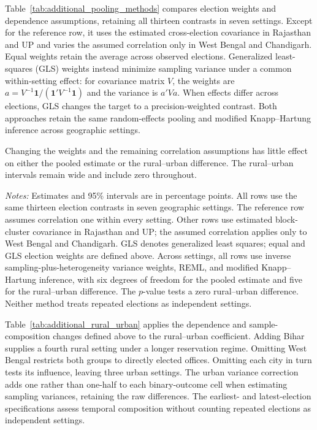 Table~\ref{tab:additional_pooling_methods} compares election weights and dependence assumptions, retaining all thirteen contrasts in seven settings. Except for the reference row, it uses the estimated cross-election covariance in Rajasthan and UP and varies the assumed correlation only in West Bengal and Chandigarh. Equal weights retain the average across observed elections. Generalized least-squares (GLS) weights instead minimize sampling variance under a common within-setting effect: for covariance matrix $V$, the weights are $a=V^{-1}\mathbf{1}/(\mathbf{1}'V^{-1}\mathbf{1})$ and the variance is $a'Va$. When effects differ across elections, GLS changes the target to a precision-weighted contrast. Both approaches retain the same random-effects pooling and modified Knapp--Hartung inference across geographic settings.

Changing the weights and the remaining correlation assumptions has little effect on either the pooled estimate or the rural--urban difference. The rural--urban intervals remain wide and include zero throughout.

\begin{table}[!htbp]
\centering
\caption{Alternative pooling methods for persistence and the rural--urban difference}
\label{tab:additional_pooling_methods}
\footnotesize
\setlength{\tabcolsep}{3pt}

\begin{minipage}{0.96\textwidth}\small
\emph{Notes:} Estimates and 95\% intervals are in percentage points. All rows use the same thirteen election contrasts in seven geographic settings. The reference row assumes correlation one within every setting. Other rows use estimated block-cluster covariance in Rajasthan and UP; the assumed correlation applies only to West Bengal and Chandigarh. GLS denotes generalized least squares; equal and GLS election weights are defined above. Across settings, all rows use inverse sampling-plus-heterogeneity variance weights, REML, and modified Knapp--Hartung inference, with six degrees of freedom for the pooled estimate and five for the rural--urban difference. The $p$-value tests a zero rural--urban difference. Neither method treats repeated elections as independent settings.
\end{minipage}
\end{table}

Table~\ref{tab:additional_rural_urban} applies the dependence and sample-composition changes defined above to the rural--urban coefficient. Adding Bihar supplies a fourth rural setting under a longer reservation regime. Omitting West Bengal restricts both groups to directly elected offices. Omitting each city in turn tests its influence, leaving three urban settings. The urban variance correction adds one rather than one-half to each binary-outcome cell when estimating sampling variances, retaining the raw differences. The earliest- and latest-election specifications assess temporal composition without counting repeated elections as independent settings.

